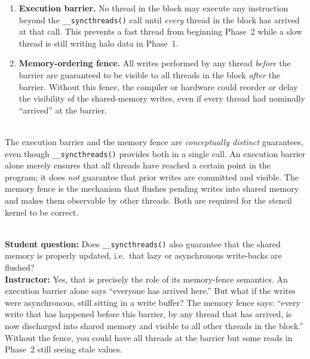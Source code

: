 \begin{enumerate}
  \item \textbf{Execution barrier.} No thread in the block may execute any
        instruction beyond the \texttt{\_\_syncthreads()} call until
        \emph{every} thread in the block has arrived at that call. This
        prevents a fast thread from beginning Phase~2 while a slow thread is
        still writing halo data in Phase~1.
 
  \item \textbf{Memory-ordering fence.} All writes performed by any thread
        \emph{before} the barrier are guaranteed to be visible to all threads
        in the block \emph{after} the barrier. Without this fence, the
        compiler or hardware could reorder or delay the visibility of the
        shared-memory writes, even if every thread had nominally ``arrived''
        at the barrier.
\end{enumerate}
 
\begin{ppkey}
  \\The execution barrier and the memory fence are \emph{conceptually distinct}
  guarantees, even though \texttt{\_\_syncthreads()} provides both in a single
  call. An execution barrier alone merely ensures that all threads have
  reached a certain point in the program; it does \emph{not} guarantee that
  prior writes are committed and visible. The memory fence is the mechanism
  that flushes pending writes into shared memory and makes them observable by
  other threads. Both are required for the stencil kernel to be correct.
\end{ppkey}
 
\begin{ppnote}
  \\\textbf{Student question:} Does \texttt{\_\_syncthreads()} also guarantee
  that the shared memory is properly updated, i.e.\ that lazy or asynchronous
  write-backs are flushed?\\[4pt]
  \textbf{Instructor:} Yes, that is precisely the role of its memory-fence
  semantics. An execution barrier alone says ``everyone has arrived here.''
  But what if the writes were asynchronous, still sitting in a write buffer?
  The memory fence says: ``every write that has happened before this barrier,
  by any thread that has arrived, is now discharged into shared memory and
  visible to all other threads in the block.'' Without the fence, you could
  have all threads at the barrier but some reads in Phase~2 still seeing stale
  values.
\end{ppnote}
 
